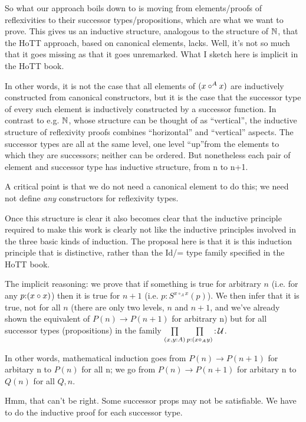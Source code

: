 \documentclass{article}
\begin{document}
So what our approach boils down to is moving from elements/proofs of
reflexivities to their successor types/propositions, which are what we
want to prove.  This gives us an inductive structure, analogous to the
structure of \(\mathbb{N}\), that the HoTT approach, based on canonical
elements, lacks.  Well, it's not so much that it goes missing as that
it goes unremarked.  What I sketch here is implicit in the HoTT book.

In other words, it is not the case that all elements of \((x\circ^A x)\)
are inductively constructed from canonical constructors, but it is the
case that the successor type of every such element is inductively
constructed by a successor function.  In contrast to e.g. \(\mathbb{N}\),
whose structure can be thought of as ``vertical'', the inductive
structure of reflexivity proofs combines ``horizontal'' and
``vertical'' aspects.  The successor types are all at the same level,
one level ``up''from the elements to which they are successors;
neither can be ordered.  But nonetheless each pair of element and
successor type has inductive structure, from n to n+1.

A critical point is that we do not need a canonical element to do
this; we need not define \emph{any} constructors for reflexivity
types.

Once this structure is clear it also becomes clear that the inductive
principle required to make this work is clearly not like the inductive
principles involved in the three basic kinds of induction.  The
proposal here is that it is this induction principle that is
distinctive, rather than the Id/= type family specified in the HoTT
book.

The implicit reasoning: we prove that if something is true for
arbitrary \(n\) (i.e. for any \(p{:}(x\circ x)\)) then it is true for
\(n+1\) (i.e. \(p{:}S^{x\circ_Ax}(p)\)).  We then infer that it is
true, not for all \(n\) (there are only two levels, \(n\) and \(n+1\),
and we've already shown the equivalent of \(P(n)\to P(n+1)\) for
arbitrary n) but for all successor types (propositions) in the family
\(\prod\limits_{(x,y:A)}\prod\limits_{p{:}(x\circ_Ay)}{:}\,\mathcal{U}\).

In other words, mathematical induction goes from \(P(n)\to P(n+1)\)
for arbitary n to \(P(n)\) for all n; we go from \(P(n)\to P(n+1)\)
for arbitary n to \(Q(n)\) for all \(Q, n\).

Hmm, that can't be right.  Some successor props may not be
satisfiable.  We have to do the inductive proof for each successor
type.
\end{document}
